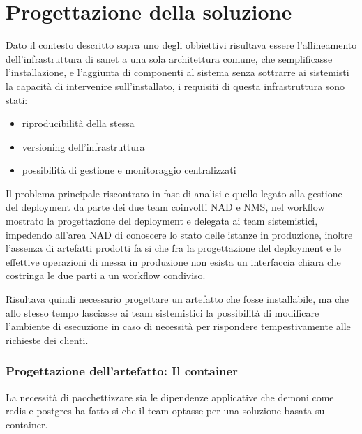\chapter{Progettazione della soluzione}

Dato il contesto descritto sopra uno degli obbiettivi risultava essere l'allineamento dell'infrastruttura di sanet a una sola architettura comune, che semplificasse l'installazione, e l'aggiunta di componenti al sistema senza sottrarre ai sistemisti la capacità di intervenire sull'installato, i requisiti di questa infrastruttura sono stati:

\begin{itemize}
\item{riproducibilità della stessa}
\item{versioning dell'infrastruttura}
\item{possibilità di gestione e monitoraggio centralizzati}
\end{itemize}

Il problema principale riscontrato in fase di analisi e quello legato alla gestione del deployment da parte dei due team coinvolti NAD e NMS, nel workflow mostrato la progettazione del deployment e delegata ai team sistemistici, impedendo all'area NAD di conoscere lo stato delle istanze in produzione, inoltre l'assenza di artefatti prodotti fa si che fra la progettazione del deployment e le effettive operazioni di messa in produzione non esista un interfaccia chiara che costringa le due parti a un workflow condiviso.

Risultava quindi necessario progettare un artefatto che fosse installabile, ma che allo stesso tempo lasciasse ai team sistemistici la possibilità di modificare l'ambiente di esecuzione in caso di necessità per rispondere tempestivamente alle richieste dei clienti.

\newpage
\subsection{Progettazione dell'artefatto: Il container}

La necessità di pacchettizzare sia le dipendenze applicative che demoni come redis e postgres ha fatto si che il team optasse per una soluzione basata su container.

